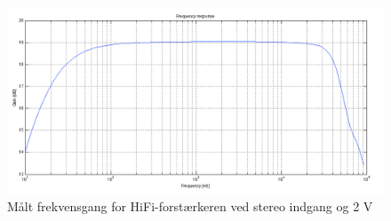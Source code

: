 \begin{figure}[h]
\centering
\includegraphics[width=\textwidth]{maalerapporter/final/stereo/final_stereo_2v_frekvensgang.png}
\caption{Målt frekvensgang for HiFi-forstærkeren ved stereo indgang og 2 V}
\label{maalerapport_final8}
\end{figure}